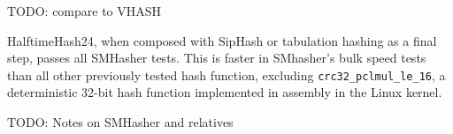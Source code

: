 \documentclass[sigconf, nonacm]{acmart}
\begin{document}
TODO: compare to VHASH

HalftimeHash24, when composed with SipHash or tabulation hashing as a final step, passes all SMHasher tests.
This is faster in SMhasher's bulk speed tests than all other previously tested hash function, excluding \texttt{crc32\_pclmul\_le\_16}, a deterministic 32-bit hash function implemented in assembly in the Linux kernel.

TODO: Notes on SMHasher and relatives






\end{document}

